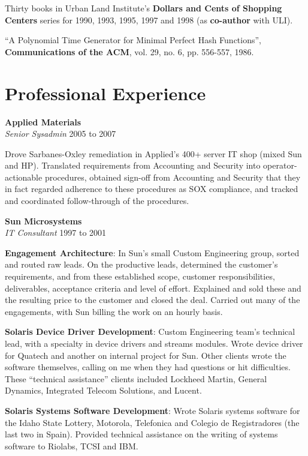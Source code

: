 \documentclass[12pt,margin,line]{res}
\newcommand{\internalskip}{\vspace{-.15in}}
\begin{document}
\begin{resume}
Thirty books in Urban Land Institute's 
{\bf Dollars and Cents of Shopping Centers}
series for 1990, 1993, 1995, 1997 and 1998
(as {\bf co-author}
with ULI).

``A Polynomial Time Generator for Minimal Perfect Hash Functions'',
{\bf Communications of the ACM},
vol.  29, no.  6, pp.  556-557, 1986.

\section{\sc Professional Experience}

{\bf Applied Materials} \\
{\em Senior Sysadmin} \hfill 2005 to 2007

\internalskip
Drove Sarbanes-Oxley remediation in Applied's 400+ server IT shop (mixed
Sun and HP).
Translated requirements from Accounting and Security into operator-actionable
procedures, obtained sign-off from Accounting and Security that they in
fact regarded adherence to these procedures as SOX compliance, and tracked
and coordinated follow-through of the procedures.

{\bf Sun Microsystems} \\
{\em IT Consultant} \hfill 1997 to 2001

\internalskip
{\bf\footnotesize Engagement Architecture}:
In Sun's small Custom Engineering group, sorted and routed raw leads.
On the productive leads, determined the customer's requirements, and from
these established scope, customer responsibilities, deliverables, acceptance
criteria and level of effort.
Explained and sold these and the resulting price to the customer and closed
the deal.
Carried out many of the engagements, with Sun billing the work on an hourly
basis.

\internalskip
{\bf\footnotesize Solaris Device Driver Development}:
Custom Engineering team's technical lead, with a specialty in device drivers
and streams modules.
Wrote device driver for Quatech and another on internal project for Sun.
Other clients wrote the software themselves, calling on me when they had
questions or hit difficulties.
These ``technical assistance''
clients included Lockheed Martin, General Dynamics, Integrated Telecom
Solutions, and Lucent.

\internalskip
{\footnotesize\bf Solaris Systems Software Development}:
Wrote Solaris systems software for the Idaho State Lottery, Motorola,
Telefonica and Colegio de Registradores (the last two in Spain).
Provided technical assistance on the writing of systems software to Riolabs,
TCSI and IBM.


\end{resume}
\end{document}
